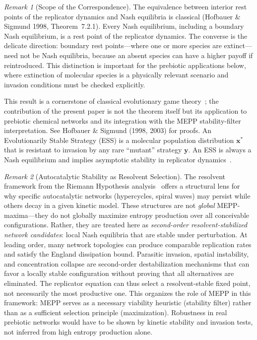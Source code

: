 \documentclass[12pt,a4paper]{article}
\theoremstyle{remark}
\newtheorem{remark}{Remark}
\begin{document}
\begin{remark}[Scope of the Correspondence]
The equivalence between interior rest points of the replicator dynamics and Nash equilibria is classical (Hofbauer \& Sigmund 1998, Theorem~7.2.1). Every Nash equilibrium, including a boundary Nash equilibrium, is a rest point of the replicator dynamics. The converse is the delicate direction: boundary rest points---where one or more species are extinct---need not be Nash equilibria, because an absent species can have a higher payoff if reintroduced. This distinction is important for the prebiotic applications below, where extinction of molecular species is a physically relevant scenario and invasion conditions must be checked explicitly.
\end{remark}

This result is a cornerstone of classical evolutionary game theory~\citep{Weibull1995}; the contribution of the present paper is not the theorem itself but its application to prebiotic chemical networks and its integration with the MEPP stability-filter interpretation. See Hofbauer \& Sigmund (1998, 2003) for proofs. An Evolutionarily Stable Strategy (ESS) is a molecular population distribution $\mathbf{x}^*$ that is resistant to invasion by any rare ``mutant'' strategy $\mathbf{y}$. An ESS is always a Nash equilibrium and implies asymptotic stability in replicator dynamics~\citep{HofbauerSigmund1998}.

\begin{remark}[Autocatalytic Stability as Resolvent Selection]
\label{rem:autocatalysis-resolvent}
The resolvent framework from the Riemann Hypothesis analysis~\citep{GeigerRH2026b} offers a structural lens for why specific autocatalytic networks (hypercycles, spiral waves) may persist while others decay in a given kinetic model. These structures are not \emph{global} MEPP-maxima---they do not globally maximize entropy production over all conceivable configurations. Rather, they are treated here as \emph{second-order resolvent-stabilized network candidates}: local Nash equilibria that are stable under perturbation. At leading order, many network topologies can produce comparable replication rates and satisfy the England dissipation bound. Parasitic invasion, spatial instability, and concentration collapse are second-order destabilization mechanisms that can favor a locally stable configuration without proving that all alternatives are eliminated. The replicator equation can thus select a resolvent-stable fixed point, not necessarily the most productive one. This organizes the role of MEPP in this framework: MEPP serves as a necessary viability heuristic (stability filter) rather than as a sufficient selection principle (maximization). Robustness in real prebiotic networks would have to be shown by kinetic stability and invasion tests, not inferred from high entropy production alone.
\end{remark}
\end{document}
